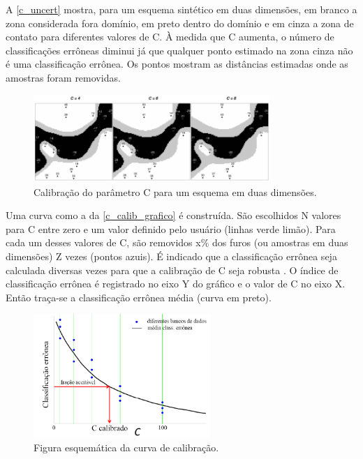 A \autoref{c_uncert} mostra, para um esquema sintético em duas dimensões, em branco a zona considerada fora domínio, em preto dentro do domínio e em cinza a zona de contato para diferentes valores de C. À medida que C aumenta, o número de classificações errôneas diminui já que qualquer ponto estimado na zona cinza não é uma classificação errônea. Os pontos mostram as distâncias estimadas onde as amostras foram removidas. 

\begin{figure}[H]
	\caption{\label{c_uncert}Calibração do parâmetro C para um esquema em duas dimensões.}
	\centering
		\includegraphics[width=0.8\textwidth]{capitulo_2/imagens/c_uncert.png}
\end{figure}

Uma curva como a da \autoref{c_calib_grafico} é construída. São escolhidos N valores para C entre zero e um valor definido pelo usuário (linhas verde limão). Para cada um desses valores de C, são removidos x\% dos furos (ou amostras em duas dimensões) Z vezes (pontos azuis). É indicado que a classificação errônea seja calculada diversas vezes para que a calibração de C seja robusta \cite{wilde2012kriging}. O índice de classificação errônea é registrado no eixo Y do gráfico e o valor de C no eixo X. Então traça-se a classificação errônea média (curva em preto).

\begin{figure}[H]
	\caption{\label{c_calib_grafico}Figura esquemática da curva de calibração.}
	\centering
		\includegraphics[width=0.6\textwidth]{capitulo_2/imagens/c_calib_schem.png}
\end{figure}

